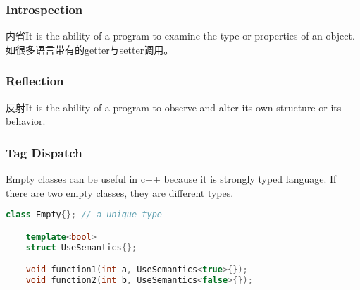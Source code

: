 \subsubsection{Introspection}
内省It is the ability of a program to examine the type or properties of an object.
如很多语言带有的getter与setter调用。

\subsubsection{Reflection}
反射It is the ability of a program to observe and alter its own structure or its behavior.

\subsubsection{Tag Dispatch}
Empty classes can be useful in c++ because it is strongly typed language. If there are two 
empty classes, they are different types.
\begin{lstlisting}[language=c++]
    class Empty{}; // a unique type

    template<bool>
    struct UseSemantics{};

    void function1(int a, UseSemantics<true>{});
    void function2(int b, UseSemantics<false>{});    
\end{lstlisting} 